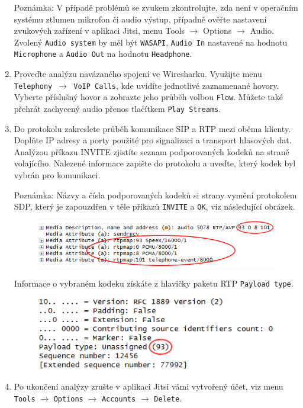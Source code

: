 \documentclass[a4paper,11pt]{article}
\begin{document}
\begin{enumerate}
     {\small Poznámka: V případě problémů se zvukem zkontrolujte, zda není v operačním systému ztlumen mikrofon či audio výstup, případně ověřte nastavení zvukových zařízení v aplikaci Jitsi, menu Tools $\rightarrow$ Options $\rightarrow$ Audio. Zvolený {\tt Audio system} by měl být {\tt WASAPI}, {\tt Audio In} nastavené na hodnotu {\tt Microphone} a {\tt Audio Out} na hodnotu {\tt Headphone}.}
 
   \item Proveďte analýzu navázaného spojení ve Wiresharku. Využijte menu {\tt Telephony $\rightarrow$ VoIP Calls}, kde uvidíte jednotlivé zaznamenané hovory. Vyberte příslušný hovor a zobrazte jeho průběh volbou {\tt Flow}.  Můžete také přehrát zachycený audio přenos tlačítkem {\tt Play Streams}.
     
    \item Do protokolu zakreslete průběh komunikace SIP a RTP mezi oběma klienty. Doplňte IP adresy a porty použité pro signalizaci a transport hlasových dat. Analýzou příkazu INVITE zjistíte seznam podporovaných kodeků na straně volajícího. Nalezené informace zapište do protokolu a uveďte, který kodek byl vybrán pro komunikaci. 

      {\small
      Poznámka: Názvy a čísla podporovaných kodeků si strany vymění protokolem SDP, který je zapouzdřen v těle příkazů {\tt INVITE} a {\tt OK}, viz následující obrázek.
\begin{figure}[h!]
  \centering
  \includegraphics[scale=0.65]{img/3a.png}
\end{figure}

\noindent Informace o vybraném kodeku získáte z hlavičky paketu RTP {\tt Payload type}.
\begin{figure}[h!]
  \centering
  \includegraphics[scale=0.65]{img/3b.png}
\end{figure}
      }
  \item Po ukončení analýzy zrušte v aplikaci Jitsi vámi vytvořený účet, viz menu {\tt Tools} $\rightarrow$ {\tt Options} $\rightarrow$ {\tt Accounts} $\rightarrow$ {\tt Delete}. 
\end{enumerate}
\end{document}
